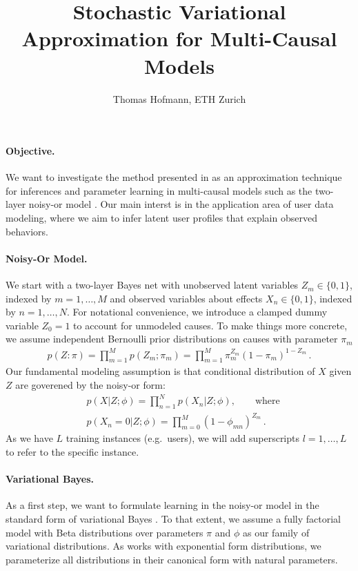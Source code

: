 \documentclass{article}
\title{Stochastic Variational Approximation for Multi-Causal Models}
\author{Thomas Hofmann, ETH Zurich}
\begin{document}
\maketitle 

\paragraph{Objective.} 

We want to investigate the method presented in \cite{salimans2013fixed} as an approximation 	technique for inferences and parameter learning in multi-causal models such as the two-layer noisy-or model \cite{shwe1991probabilistic,jaakkola1999variational}. Our main interst is in the application area of user data modeling, where we aim to infer latent user profiles that explain observed behaviors. 

\paragraph{Noisy-Or Model.} 

We start with a two-layer Bayes net with unobserved latent variables $Z_m \in \{0,1\}$, indexed by $m=1,\dots,M$ and observed variables about effects $X_n \in \{0,1\}$, indexed by $n=1,\dots,N$. For notational convenience, we introduce a clamped dummy variable $Z_0=1$ to account for unmodeled causes. To make things more concrete, we assume independent Bernoulli prior distributions on causes with parameter $\pi_m$
\begin{align}
p(Z: \pi) = \prod_{m=1}^M p(Z_m; \pi_m) = \prod_{m=1} ^M \pi_m^{Z_m} (1-\pi_m)^{1-Z_m} \,.
\end{align}
Our fundamental modeling assumption is that conditional distribution of $X$ given $Z$ are goverened by the noisy-or form:
\begin{align}
& p(X|Z; \phi) = \prod_{n=1}^N p(X_n|Z; \phi), \qquad \text{where} \\
& p(X_n=0|Z; \phi ) = \prod_{m=0}^M (1- \phi_{mn})^{Z_m} \,.
\end{align}
As we have $L$ training instances (e.g.~users), we will add superscripts $l=1,\dots,L$ to refer to the specific instance.

\paragraph{Variational Bayes.} 

As a first step, we want to formulate learning in the noisy-or model in the standard form of variational Bayes  \cite{attias2000variational}. To that extent, we assume a fully factorial model with Beta distributions over parameters $\pi$ and $\phi$ as our family of variational distributions. As \cite{salimans2013fixed} works with exponential form distributions, we parameterize all distributions in their canonical form with natural parameters. \\
\end{document}
